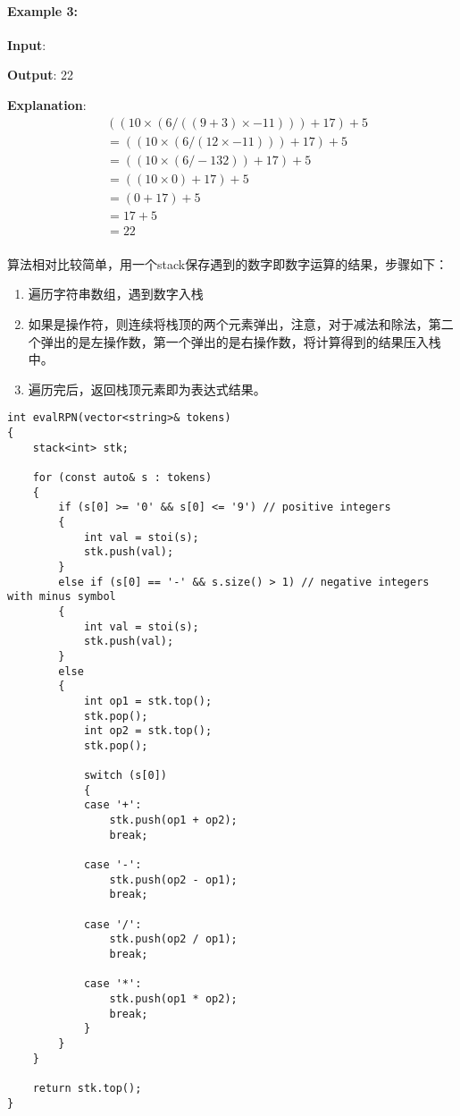 \paragraph{Example 3:}
\begin{flushleft}
\textbf{Input}: \fcj{["10", "6", "9", "3", "+", "-11", "*", "/", "*", "17", "+", "5", "+"]}

\textbf{Output}: 22

\textbf{Explanation}:
\begin{align*}
& ((10 \times (6 / ((9 + 3) \times -11))) + 17) + 5 \\
&= ((10 \times (6 / (12 \times -11))) + 17) + 5 \\
&= ((10 \times (6 / -132)) + 17) + 5 \\
&= ((10 \times 0) + 17) + 5\\
&= (0 + 17) + 5\\
&= 17 + 5\\
&= 22\\
\end{align*}
\end{flushleft}
算法相对比较简单，用一个stack保存遇到的数字即数字运算的结果，步骤如下：
\begin{enumerate}
\item 遍历字符串数组，遇到数字入栈
\item 如果是操作符，则连续将栈顶的两个元素弹出，注意，对于减法和除法，第二个弹出的是左操作数，第一个弹出的是右操作数，将计算得到的结果压入栈中。
\item 遍历完后，返回栈顶元素即为表达式结果。
\end{enumerate}
\setcounter{lstlisting}{0}
\begin{lstlisting}[style=customc, caption={Stack Based Approach}]
int evalRPN(vector<string>& tokens)
{
	stack<int> stk;
	
	for (const auto& s : tokens)
	{
		if (s[0] >= '0' && s[0] <= '9') // positive integers
		{
			int val = stoi(s);
			stk.push(val);
		}
		else if (s[0] == '-' && s.size() > 1) // negative integers with minus symbol
		{
			int val = stoi(s);
			stk.push(val);
		}
		else
		{
			int op1 = stk.top();
			stk.pop();
			int op2 = stk.top();
			stk.pop();

			switch (s[0])
			{
			case '+':
				stk.push(op1 + op2);
				break;

			case '-':
				stk.push(op2 - op1);
				break;

			case '/':
				stk.push(op2 / op1);
				break;

			case '*':
				stk.push(op1 * op2);
				break;
			}
		}
	}

	return stk.top();
}
\end{lstlisting}